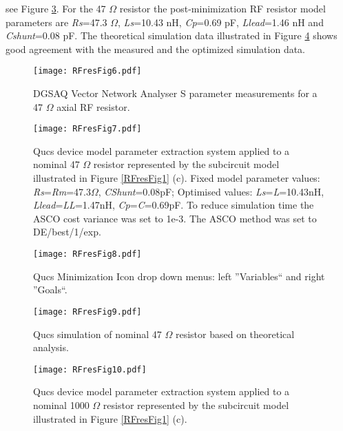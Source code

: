 see Figure \ref{RFresFig8}.
For the 47 $\Omega$ resistor the post-minimization RF resistor model parameters are \textit{Rs}=47.3 $\Omega$, \textit{Ls}=10.43 nH, \textit{Cp}=0.69 pF,
\textit{Llead}=1.46 nH and \textit{Cshunt}=0.08 pF. The theoretical simulation data illustrated in Figure \ref{RFresFig9} shows good agreement with the measured and the
optimized simulation data.
\begin{figure}[h]
\begin{center}
	\texttt{[image: RFresFig6.pdf]}
	\caption{DGSAQ Vector Network Analyser S parameter measurements for a 47 $\Omega$ axial RF resistor.}
	\label{RFresFig6}
\end{center}
\end{figure}

\begin{figure}[hp]
\begin{center}
	\texttt{[image: RFresFig7.pdf]}
	\caption{Qucs device model parameter extraction system applied to a nominal 47 $\Omega$ resistor represented by the subcircuit model illustrated in Figure \ref{RFresFig1} (c).
	 Fixed model parameter values: \textit{Rs}=\textit{Rm}=47.3$\Omega$, \textit{CShunt}=0.08pF; Optimised values: \textit{Ls}=\textit{L}=10.43nH,
	 \textit{Llead}=\textit{LL}=1.47nH, \textit{Cp}=\textit{C}=0.69pF. To reduce simulation time the ASCO cost variance was set to 1e-3. The ASCO method was set to DE/best/1/exp.}
	\label{RFresFig7}
\end{center}
\end{figure}
\begin{figure}[p]
\begin{center}
	\texttt{[image: RFresFig8.pdf]}
	\caption{Qucs Minimization Icon drop down menus: left ''Variables`` and right ''Goals``.}
	\label{RFresFig8}
\end{center}
\end{figure}
\begin{figure}[h]
\begin{center}
	\texttt{[image: RFresFig9.pdf]}
	\caption{Qucs simulation of nominal 47 $\Omega$ resistor based on theoretical analysis.}
	\label{RFresFig9}
\end{center}
\end{figure}
\begin{figure}[h]
\begin{center}
	\texttt{[image: RFresFig10.pdf]}
	\caption{Qucs device model parameter extraction system applied to a nominal 1000 $\Omega$ resistor represented by the subcircuit model illustrated in Figure \ref{RFresFig1} (c).}
	\label{RFresFig10}
\end{center}
\end{figure}
